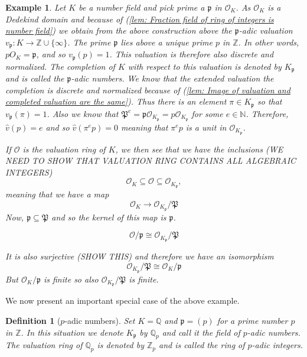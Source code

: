 \documentclass{article}
\newtheorem{definition}{Definition}[section]
\newtheorem{example}{Example}[section]
\newcommand{\mfrak}[1]{\mathfrak{#1}}
\newcommand{\mcal}[1]{\mathcal{#1}}
\newcommand{\mbb}[1]{\mathbb{#1}}
\begin{document}
\begin{example}\label{ex: P-adic numbers}
    Let $K$ be a number field and pick prime a $\mfrak p$ in $\mcal O_K$. As $\mcal O_K$ is a Dedekind domain and because of (\ref{lem: Fraction field of ring of integers is number field}) we obtain from the above construction above the $\mfrak p$-adic valuation $v_\mfrak p : K \to \mbb Z \cup \{\infty \}$. The prime $\mfrak p$ lies above a unique prime $p$ in $\mbb Z$. In other words, $p O_K = \mfrak p$, and so $v_\mfrak p(p) = 1$. This valuation is therefore also discrete and normalized. The completion of $K$ with respect to this valuation is denoted by $K_\mfrak p$ and is called the $\mfrak p$-adic numbers. We know that the extended valuation the completion is discrete and normalized because of (\ref{lem: Image of valuation and completed valuation are the same}). Thus there is an element $\pi \in K_\mfrak p$ so that $v_\mfrak p(\pi) = 1$. Also we know that $\mfrak P^e = \mfrak p \mcal O_{K_\mfrak p} = p \mcal O_{K_\mfrak p}$ for some $e \in \mbb N$. Therefore, $\hat v(p) = e$ and so $\hat v(\pi^e p) = 0$ meaning that $\pi^e p$ is a unit in $\mcal O_{K_\mfrak p}$. 
    
    
    
    

    
    
    
    
    
    
    
    If $\mcal O$ is the valuation ring of $K$, we then see that we have the inclusions (WE NEED TO SHOW THAT VALUATION RING CONTAINS ALL ALGEBRAIC INTEGERS)
    $$\mcal O_K \subseteq \mcal O \subseteq \mcal O_{K_\mfrak p},$$  
    meaning that we have a map
    $$\mcal O_K \to \mcal O_{K_\mfrak p} / \mfrak P$$
    Now, $\mfrak p \subseteq \mfrak P$ and so the kernel of this map is $\mfrak p$. 

    $$\mcal O / \mfrak p \cong \mcal O_{K_\mfrak p} / \mfrak P$$
    
    
    It is also surjective (SHOW THIS) and therefore we have an isomorphism 
    $$\mcal O_{K_\mfrak p} / \mfrak P \cong \mcal O_K / \mfrak p$$
    But $\mcal O_K / \mfrak p$ is finite so also $\mcal O_{K_\mfrak p} / \mfrak P$ is finite. 
\end{example}

We now present an important special case of the above example.

\begin{definition}[$p$-adic numbers] 
    Set $K = \mbb Q$ and $\mfrak p = (p)$ for a prime number $p$ in $\mbb Z$. In this situation we denote $K_\mfrak p$ by $\mbb Q_p$ and call it the field of $p$-adic numbers. The valuation ring of $\mbb Q_p$ is denoted by $\mbb Z_p$ and is called the ring of $p$-adic integers.
\end{definition}
\end{document}
